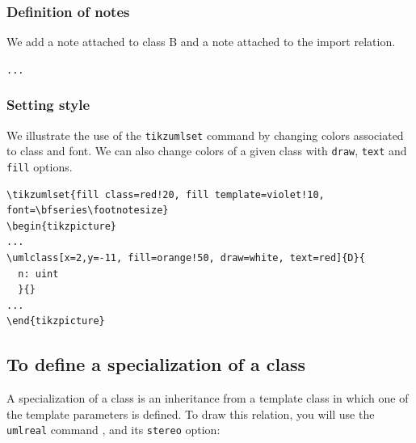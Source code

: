 \documentclass[a4paper,11pt]{report}
\begin{document}
\begin{center}
\end{center}

\subsubsection{Definition of notes}

We add a note attached to class B and a note attached to the import relation.

\medskip

\hspace{-0.7cm}\lstinline{...}
{\color{red!70!black}
	
}

\begin{center}
\end{center}

\subsubsection{Setting style}

We illustrate the use of the {\tt tikzumlset} command by changing colors associated to class and font.
We can also change colors of a given class with {\tt draw}, {\tt text} and {\tt fill} options.

\medskip

\begin{lstlisting}
\tikzumlset{fill class=red!20, fill template=violet!10, font=\bfseries\footnotesize}
\begin{tikzpicture}
...
\umlclass[x=2,y=-11, fill=orange!50, draw=white, text=red]{D}{
  n: uint
  }{}
...
\end{tikzpicture}
\end{lstlisting}

\begin{center}
\end{center}

\subsection{To define a specialization of a class}

A specialization of a class is an inheritance from a template class in which one of the template parameters is defined. To draw this relation,  you will use the {\tt umlreal} command , and its {\tt stereo} option:
\end{document}
